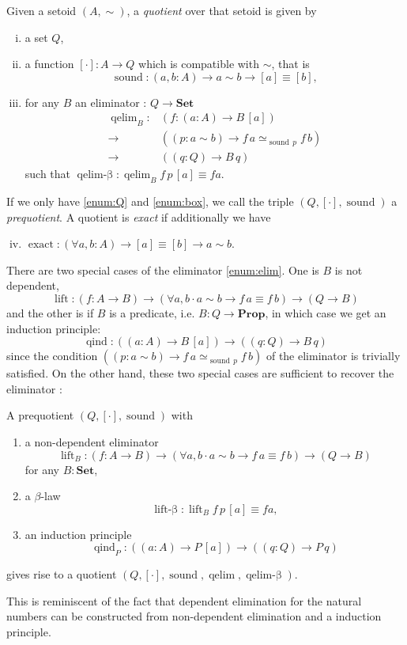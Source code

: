 \documentclass{llncs}
\newcommand{\prop}{\mathbf{Prop}}
\newcommand{\bocks}[1]{[#1]}
\DeclareMathOperator*{\sound}{\mathrm{sound}}
\DeclareMathOperator*{\qelimok}{\mathrm{qelim}-\beta}
\DeclareMathOperator{\qind}{\mathrm{qind}}
\DeclareMathOperator*{\exact}{\mathrm{exact}}
\newcommand{\Set}{\mathbf{Set}}
\DeclareMathOperator{\elim}{\mathrm{qelim}}
\DeclareMathOperator{\nlift}{\mathrm{lift}}
\DeclareMathOperator{\nliftbeta}{\mathrm{lift}-\beta}
\begin{document}
\begin{definition}
\label{def:quotient}
Given a setoid $(A,\sim)$,  a \emph{quotient} over that setoid is given by

\begin{enumerate}[i.]
\item \label{enum:Q} a set $Q$,
\item \label{enum:box}a function $\bocks\cdot\colon A \to Q$ which is compatible with $\sim$, 
that is \[\sound\colon (a,b : A) \to a\sim b \to [a] \equiv [b],\]
\item \label{enum:elim}   for any $B$ an eliminator : $Q\to\Set$
 \begin{align*}
 \elim_B\colon &(f\colon (a:A) \to B\,\bocks a) \\
        {\to}\, &((p:a\sim b) \to f\,a \simeq_{\sound\,p}f\,b)\\
        {\to}\, &((q:Q) \to B\,q)
 \end{align*}
such that $\qelimok\colon \elim_B f \,p\,\bocks a\equiv f a$.
 
\end{enumerate}
If we only have \ref{enum:Q} and \ref{enum:box}, we call the triple $(Q,\bocks\cdot, \sound)$ a \emph{prequotient}.
A quotient is \emph{exact} if additionally
we have 
\begin{enumerate}[i.]
\setcounter{enumi}{3}
\item $\exact :(\forall a,b : A) \to  \bocks a \equiv \bocks b \to a \sim b$.

\end{enumerate}
\end{definition}

There are two special cases of the eliminator \ref{enum:elim}. One is $B$ is not dependent,
 \[\nlift\colon (f\colon A \to B) \to (\forall a,b\cdot a\sim b \to f\,a \equiv f\,b) \to (Q \to B)\]
and the other is if $B$ is a predicate, i.e. $B : Q\to \prop$, in which case we get an induction principle:
\[\qind \colon((a\colon A)\to B \,\bocks a)\to ((q\colon Q)\to B\,q)\]
since the condition $((p:a\sim b) \to f\,a \simeq_{\sound\,p}f\,b) $  of  the eliminator is trivially satisfied.
On the other hand, these two special cases are sufficient to recover the eliminator :      


\begin{proposition}\label{prop:nlifteq}
A prequotient $(Q,\bocks\cdot,\sound)$ with 

\begin{enumerate}
\item a non-dependent eliminator $$\nlift_B\colon (f\colon A \to B) \to (\forall a,b\cdot a\sim b \to f\,a \equiv f\,b) \to (Q \to B)$$ for any $B\colon\Set$,
\item a $\beta$-law $$\nliftbeta : \nlift_B f \,p\,\bocks a\equiv f a,$$
\item an induction principle $$\qind_P\colon ((a\colon A)\to P \,\bocks a)\to ((q\colon Q)\to P\,q)$$
\end{enumerate} 
gives rise to a quotient $(Q,\bocks\cdot,\sound,\elim,\qelimok)$.
\end{proposition}
This is reminiscent of the fact that dependent elimination for the natural numbers can be constructed from non-dependent elimination and a induction principle.
\end{document}
